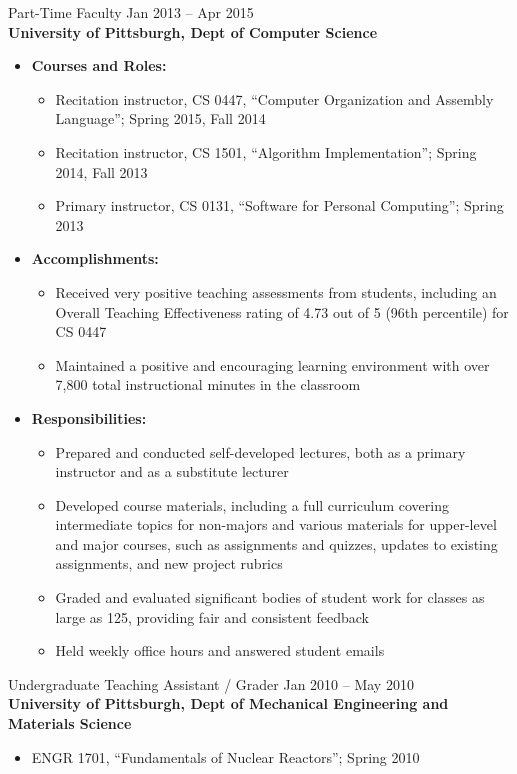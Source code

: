 \documentclass[11pt]{article}
\newcommand{\textdb}[1]{\fontseries{db}\selectfont#1\normalfont}
\begin{document}
\textdb{
Part-Time Faculty
	\hfill Jan 2013 -- Apr 2015 \\
}
\textbf{University of Pittsburgh, Dept of Computer Science}
\begin{itemize}
	\item \textbf{Courses and Roles:}
		\begin{itemize}
			\item Recitation instructor, CS 0447, ``Computer Organization and Assembly Language'';
				Spring 2015, Fall 2014
			\item Recitation instructor, CS 1501, ``Algorithm Implementation'';
				Spring 2014, Fall 2013
			\item Primary instructor, CS 0131, ``Software for Personal Computing'';
				Spring 2013
		\end{itemize}
	\item \textbf{Accomplishments:}
		\begin{itemize}
			\item Received very positive teaching assessments from students,
				including an Overall Teaching Effectiveness rating of 4.73 out of 5
				(96th percentile) for CS 0447
			\item Maintained a positive and encouraging learning environment
				with over 7,800 total instructional minutes in the classroom
		\end{itemize}
	\item \textbf{Responsibilities:}
		\begin{itemize}
			\item Prepared and conducted self-developed lectures,
				both as a primary instructor and as a substitute lecturer
			\item Developed course materials, including a full curriculum
				covering intermediate topics for non-majors
				and various materials for upper-level and major courses,
				such as assignments and quizzes, updates to existing assignments,
				and new project rubrics
			\item Graded and evaluated significant bodies of student work
				for classes as large as 125, providing fair and consistent feedback
			\item Held weekly office hours and answered student emails
		\end{itemize}
\end{itemize}

\selectfont
Undergraduate Teaching Assistant / Grader
	\hfill Jan 2010 -- May 2010 \\
\normalfont
\textbf{University of Pittsburgh, Dept of Mechanical Engineering and Materials Science}
\begin{itemize}
	\item ENGR 1701, ``Fundamentals of Nuclear Reactors''; Spring 2010
\end{itemize}
\end{document}
